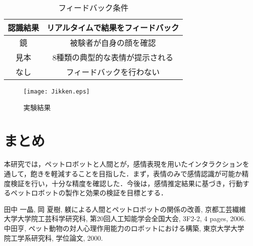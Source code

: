 \documentclass[twocolumn,a4j]{jarticle}
\begin{document}
\vspace{-3mm}
\begin{table}[h]
\centering
\caption{フィードバック条件}
\begin{tabular}{|c|c|}
	\hline
		認識結果 & リアルタイムで結果をフィードバック \\
	\hline
		鏡 & 被験者が自身の顔を確認 \\
	\hline
		見本 & 8種類の典型的な表情が提示される \\
	\hline
		なし & フィードバックを行わない\\
	\hline
\end{tabular}
\label{Environment List}
\end{table}
\vspace{-5mm}

\begin{figure}[h]
\begin{center}
\texttt{[image: Jikken.eps]}
\end{center}
\vspace{-8mm}
\caption{実験結果}
\label{Jikken} %
\end{figure}


\vspace{-10mm}
\section{まとめ}
本研究では，ペットロボットと人間とが，感情表現を用いたインタラクションを通して，飽きを軽減することを目指した．まず，表情のみで感情認識が可能か精度検証を行い，十分な精度を確認した．今後は，感情推定結果に基づき，行動するペットロボットの製作と効果の検証を目標とする．



\vspace{-6mm}
\begin{thebibliography}{9}\setlength{\itemsep}{2ex}\small
{}
田中 一晶, 岡 夏樹, 躾による人間とペットロボットの関係の改善, 京都工芸繊維大学大学院工芸科学研究科, 第20回人工知能学会全国大会, 3F2-2, 4 pages, 2006.
中田亨, ペット動物の対人心理作用能力のロボットにおける構築, 東京大学大学院工学系研究科, 学位論文, 2000.


\end{thebibliography}
\end{document}
